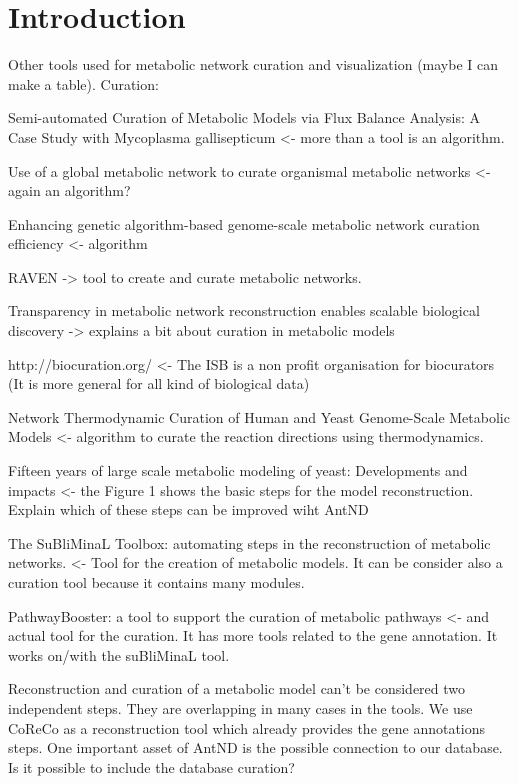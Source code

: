 \section{Introduction}

Other tools used for metabolic network curation and visualization (maybe I can make a table).
Curation: 

Semi-automated Curation of Metabolic Models via Flux Balance Analysis: A Case Study with Mycoplasma gallisepticum <- more than a tool is an algorithm.

Use of a global metabolic network to curate organismal metabolic networks <- again an algorithm?

Enhancing genetic algorithm-based genome-scale metabolic network curation efficiency <- algorithm

RAVEN -> tool to create and curate metabolic networks.

Transparency in metabolic network reconstruction enables scalable biological discovery -> explains a bit about curation in metabolic models

http://biocuration.org/ <- The ISB is a non profit organisation for biocurators (It is more general for all kind of biological data)

Network Thermodynamic Curation of Human and Yeast Genome-Scale Metabolic Models <- algorithm to curate the reaction directions using thermodynamics.

Fifteen years of large scale metabolic modeling of yeast: Developments and impacts <- the Figure 1 shows the basic steps for the model reconstruction. Explain which of these steps can be improved wiht AntND

The SuBliMinaL Toolbox: automating steps in the reconstruction of metabolic networks. <- Tool for the creation of metabolic models. It can be consider also a curation tool because it contains many modules.

PathwayBooster: a tool to support the curation of metabolic pathways <- and actual tool for the curation. It has more tools related to the gene annotation. It works on/with the suBliMinaL tool.

Reconstruction and curation of a metabolic model can't be considered two independent steps. They are overlapping in many cases in the tools. We use CoReCo as a reconstruction tool which already provides the gene annotations steps. 
One important asset of AntND is the possible connection to our database. Is it possible to include the database curation?

